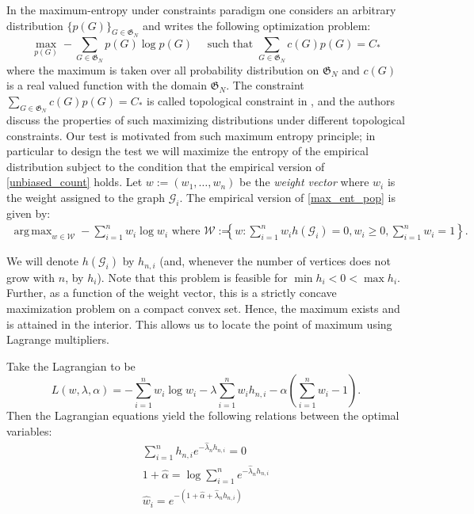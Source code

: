 \documentclass[12pt]{article}
\DeclareMathOperator*{\argmax}{arg\,max}
\numberwithin{equation}{section}
\begin{document}

In the maximum-entropy under constraints paradigm one considers an arbitrary distribution $\{p(G)\}_{G\in \mathfrak{G}_N}$ and writes the following optimization problem:
\begin{equation}\max_{p(G)} -\sum_{G \in \mathfrak{G}_N}p(G)\log p(G) \quad \text{ such that } \sum_{G \in \mathfrak{G}_N} c(G)p(G)=C_*\label{max_ent_pop}\end{equation}
where the maximum is taken over all probability distribution on $\mathfrak{G}_N$ and $c(G)$ is a real valued function with the domain $\mathfrak{G}_N$. The constraint $\sum_{G \in \mathfrak{G}_N} c(G)p(G)=C_*$ is called topological constraint in \cite{squartini2017maximum}, and the authors discuss the properties of such maximizing  distributions under different topological constraints.
Our test is motivated from such maximum entropy principle; in particular to design the test we will maximize the entropy of the empirical distribution subject to the condition that the empirical version of \eqref{unbiased_count} holds. Let $w:=(w_1,\ldots,w_n)$ be the \textit{weight vector} where $w_i$ is the weight assigned to the graph $\mathcal{G}_i$. The empirical version of \eqref{max_ent_pop} is given by:
\begin{align*}
\argmax_{w\in \mathcal{W}} -\sum_{i=1}^n w_i\log w_i 
\text{ where }  \mathcal{W}:= & \left\{w:\sum_{i=1}^nw_ih(\mathcal{G}_i)=0, w_i\geq 0, \sum_{i=1}^n w_i=1\right\}.
\end{align*}


 We will denote $h(\mathcal{G}_i)$ by $h_{n,i}$ (and, whenever the number of vertices does not grow with $n$, by $h_i$). Note that this problem is feasible for $ \min h_i<0<\max h_i$. Further, as a function of the weight vector, this is a strictly concave maximization problem on a compact convex set. Hence, the maximum exists and is attained in the interior. This allows us to locate the point of maximum using Lagrange multipliers.


Take the Lagrangian to be
\[
L(w,\lambda,\alpha)=-\sum_{i=1}^n w_{i} \log w_{i}-\lambda \sum_{i=1}^n w_{i} h_{n,i}-\alpha\left(\sum_{i=1}^n w_{i}-1\right).
\]
Then the Lagrangian equations yield the following relations between the optimal variables:
\begin{align}
\sum_{i=1}^n h_{n,i} e^{-\hat{\lambda}_nh_{n,i}}=0\label{root_eqn}\\
1+\hat{\alpha}=\log \sum_{i=1}^n e^{-\hat{\lambda}_nh_{n,i}}\label{opt_alpha}\\
\hat{w}_i=e^{-(1+\hat{\alpha}+\hat{\lambda}_nh_{n,i})}\label{opt_weight}
\end{align}
\end{document}
